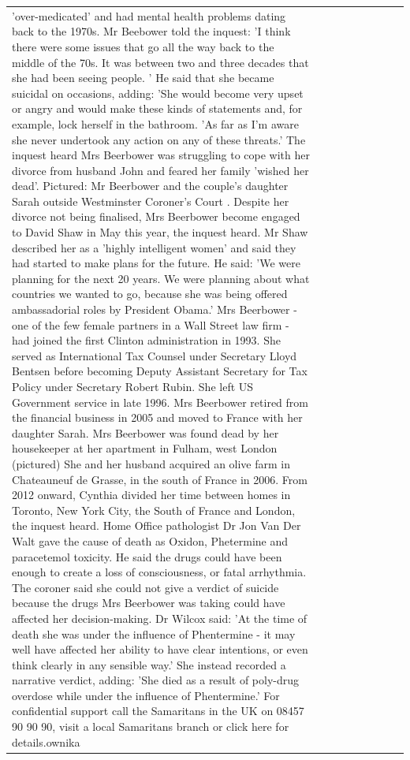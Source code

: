 \begin{table}[H]
\begin{tabular}{lllrlllll}
'over-medicated' and had mental health problems dating back to the 1970s. Mr Beebower told the inquest: 'I think there were some issues that go all the way back to the middle of the 70s. It was between two and three decades that she had been seeing people. ' He said that she became suicidal on occasions, adding: 'She would become very upset or angry and would make these kinds of statements and, for example, lock herself in the bathroom. 'As far as I'm aware she never undertook any action on any of these threats.' The inquest heard Mrs Beerbower was struggling to cope with her divorce from husband John and feared her family 'wished her dead'. Pictured: Mr Beerbower and the couple's daughter Sarah outside Westminster Coroner's Court . Despite her divorce not being finalised, Mrs Beerbower become engaged to David Shaw in May this year, the inquest heard. Mr Shaw described her as a 'highly intelligent women' and said they had started to make plans for the future. He said: 'We were planning for the next 20 years. We were planning about what countries we wanted to go, because she was being offered ambassadorial roles by President Obama.' Mrs Beerbower - one of the few female partners in a Wall Street law firm - had joined the first Clinton administration in 1993. She served as International Tax Counsel under Secretary Lloyd Bentsen before becoming Deputy Assistant Secretary for Tax Policy under Secretary Robert Rubin. She left US Government service in late 1996. Mrs Beerbower retired from the financial business in 2005 and moved to France with her daughter Sarah. Mrs Beerbower was found dead by her housekeeper at her apartment in Fulham, west London (pictured) She and her husband acquired an olive farm in Chateauneuf de Grasse, in the south of France in 2006. From 2012 onward, Cynthia divided her time between homes in Toronto, New York City, the South of France and London, the inquest heard. Home Office pathologist Dr Jon Van Der Walt gave the cause of death as Oxidon, Phetermine and paracetemol toxicity. He said the drugs could have been enough to create a loss of consciousness, or fatal arrhythmia. The coroner said she could not give a verdict of suicide because the drugs Mrs Beerbower was taking could have affected her decision-making. Dr Wilcox said: 'At the time of death she was under the influence of Phentermine - it may well have affected her ability to have clear intentions, or even think clearly in any sensible way.' She instead recorded a narrative verdict, adding: 'She died as a result of poly-drug overdose while under the influence of Phentermine.' For confidential support call the Samaritans in the UK on 08457 90 90 90, visit a local Samaritans branch or click here for details.ownika \\

\end{tabular}
\end{table}
